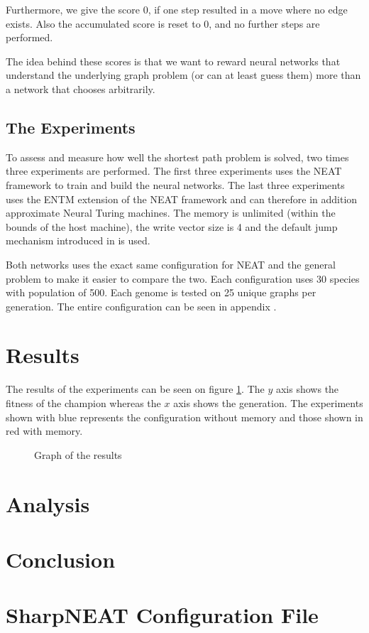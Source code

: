 \documentclass{article}
\begin{document}
Furthermore, we give the score 0, if one step resulted in a move where no edge exists. Also the accumulated score is reset to 0, and no further steps are performed.

The idea behind these scores is that we want to reward neural networks that understand the underlying graph problem (or can at least guess them) more than a network that chooses arbitrarily.

\subsection{The Experiments}
To assess and measure how well the shortest path problem is solved, two times three experiments are performed. The first three experiments uses the NEAT framework to train and build the neural networks. The last three experiments uses the ENTM extension of the NEAT framework and can therefore in addition approximate Neural Turing machines. The memory is unlimited (within the bounds of the host machine), the write vector size is 4 and the default jump mechanism introduced in  is used. 

Both networks uses the exact same configuration for NEAT and the general problem to make it easier to compare the two. Each configuration uses 30 species with population of 500. Each genome is tested on 25 unique graphs per generation. The entire configuration can be seen in appendix . 

\section{Results}
The results of the experiments can be seen on figure \ref{experiments:graph:1}. The $ y $ axis shows the fitness of the champion whereas the $ x $ axis shows the generation. The experiments shown with blue represents the configuration without memory and those shown in red with memory. 

\begin{figure}
	\caption{Graph of the results}
	\label{experiments:graph:1}
\end{figure}



\section{Analysis}



\section{Conclusion}

\newpage
\appendix
\section{SharpNEAT Configuration File}
\end{document}

